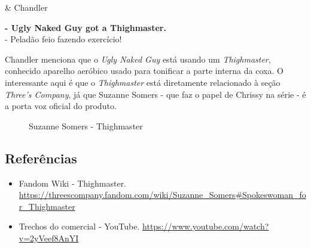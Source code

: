 \begin{tcolorbox}[enhanced,center upper,
    drop fuzzy shadow southeast, boxrule=0.3pt,
    lower separated=false,
    colframe=black!30!dialogoBorder,colback=white]
\begin{minipage}[c]{0.14\linewidth}
   & \centering \scriptsize{Chandler}
\end{minipage}
\hspace{.1mm}
\begin{minipage}[c]{0.8\linewidth}
  \textbf{- Ugly Naked Guy got a Thighmaster.}\\
  - Peladão feio fazendo exercício!
\end{minipage}
\end{tcolorbox}

Chandler menciona que o \emph{Ugly Naked Guy} está usando um
\emph{Thighmaster}, conhecido aparelho aeróbico usado para tonificar a
parte interna da coxa. O interessante aqui é que o \emph{Thighmaster}
está diretamente relacionado à seção \emph{Three's Company}, já que
Suzanne Somers - que faz o papel de Chrissy na série - é a porta voz
oficial do produto.

\begin{figure}
  \centering
    \caption{Suzanne Somers - Thighmaster\label{fig:suzanne-somers-thighmaster}}
\end{figure}

\hypertarget{referuxeancias-2}{%
\subsection{Referências}\label{referuxeancias-2}}

\begin{itemize}
\tightlist
\item
  \sloppy Fandom Wiki - Thighmaster. \url{https://threescompany.fandom.com/wiki/Suzanne_Somers#Spokeswoman_for_Thighmaster}
\item
  \sloppy Trechos do comercial - YouTube. \url{https://www.youtube.com/watch?v=2yVeef8AnYI}
\end{itemize}

